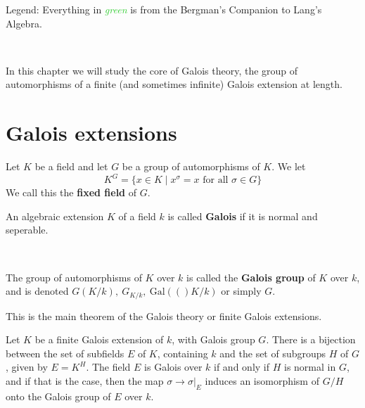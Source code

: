 
\usepackage{thmtools}
\usepackage{makeidx}
\makeindex


\newcommand{\Gal}[1]{\text{Gal}(#1)}
\newcommand{\Bergman}[1]{\textcolor{LimeGreen}{\textit{#1}}}

Legend: Everything in \Bergman{green} is from the Bergman's Companion to Lang's Algebra.

\

In this chapter we will study the core of Galois theory, the group of automorphisms of a finite (and sometimes infinite) Galois extension at length.
    \section{Galois extensions}
\begin{definition}
    Let $K$ be a field and let $G$ be a group of automorphisms of $K$. We let \[K^G = \{x\in K\mid x^\sigma = x \text{ for all }\sigma \in G\}\]We call this the \textbf{fixed field} of $G$. 
\end{definition}

\begin{definition}
    An algebraic extension $K$ of a field $k$ is called \textbf{Galois} if it is normal and seperable.

    \

    The group of automorphisms of $K$ over $k$ is called the \textbf{Galois group} of $K$ over $k$, and is denoted $G(K/k), \ G_{K/k}, \ \Gal(K/k)$ or simply $G$.
\end{definition}

This is the main theorem of the Galois theory or finite Galois extensions.
\begin{theorem}\label{main}
    Let $K$ be a finite Galois extension of $k$, with Galois group $G$. There is a bijection between the set of subfields $E$ of $K$, containing $k$ and the set of subgroups $H$ of $G$, given by $E=K^H$. The field $E$ is Galois over $k$ if and only if $H$ is normal in $G$, and if that is the case, then the map $\sigma\rightarrow \sigma|_E$ induces an isomorphism
    of $G/H$ onto the Galois group of $E$ over $k$.
\end{theorem}

